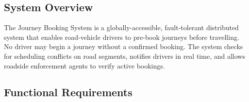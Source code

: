 \documentclass[12pt,a4paper]{article}
\begin{document}
\subsection{System Overview}

The Journey Booking System is a globally-accessible, fault-tolerant distributed system that enables road-vehicle drivers to pre-book journeys before travelling. No driver may begin a journey without a confirmed booking. The system checks for scheduling conflicts on road segments, notifies drivers in real time, and allows roadside enforcement agents to verify active bookings.

\subsection{Functional Requirements}
\end{document}

